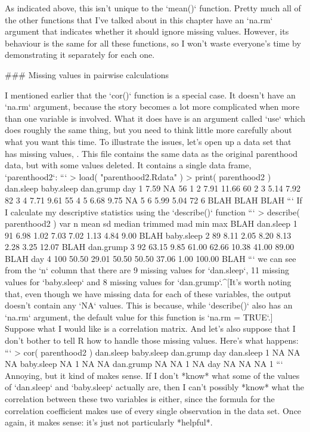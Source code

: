 As indicated above, this isn't unique to the `mean()` function. Pretty much all of the other functions that I've talked about in this chapter have an `na.rm` argument that indicates whether it should ignore missing values. However, its behaviour is the same for all these functions, so I won't waste everyone's time by demonstrating it separately for each one.


### Missing values in pairwise calculations

I mentioned earlier that the `cor()` function is a special case. It doesn't have an `na.rm` argument, because the story becomes a lot more complicated when more than one variable is involved. What it does have is an argument called `use` which does roughly the same thing, but you need to think  little more carefully about what you want this time. To illustrate the issues, let's open up a data set that has missing values, . This file contains the same data as the original parenthood data, but with some values deleted. It contains a single data frame, `parenthood2`:
```
> load( "parenthood2.Rdata" )
> print( parenthood2 )
  dan.sleep baby.sleep dan.grump day
1      7.59         NA        56   1
2      7.91      11.66        60   2
3      5.14       7.92        82   3
4      7.71       9.61        55   4
5      6.68       9.75        NA   5
6      5.99       5.04        72   6
BLAH BLAH BLAH
```
If I calculate my descriptive statistics using the `describe()` function
```
> describe( parenthood2 )
           var   n  mean    sd median trimmed   mad   min    max    BLAH
dan.sleep    1  91  6.98  1.02   7.03    7.02  1.13  4.84   9.00    BLAH
baby.sleep   2  89  8.11  2.05   8.20    8.13  2.28  3.25  12.07    BLAH
dan.grump    3  92 63.15  9.85  61.00   62.66 10.38 41.00  89.00    BLAH
day          4 100 50.50 29.01  50.50   50.50 37.06  1.00 100.00    BLAH
```
we can see from the `n` column that there are 9 missing values for `dan.sleep`, 11 missing values for `baby.sleep` and 8 missing values for `dan.grump`.^[It's worth noting that, even though we have missing data for each of these variables, the output doesn't contain any `NA` values. This is because, while `describe()` also has an `na.rm` argument, the default value for this function is `na.rm = TRUE`.] Suppose what I would like is a correlation matrix. And let's also suppose that I don't bother to tell R how to handle those missing values. Here's what happens:
```
> cor( parenthood2 )
           dan.sleep baby.sleep dan.grump day
dan.sleep          1         NA        NA  NA
baby.sleep        NA          1        NA  NA
dan.grump         NA         NA         1  NA
day               NA         NA        NA   1
```
Annoying, but it kind of makes sense. If I don't *know* what some of the values of `dan.sleep` and `baby.sleep` actually are, then I can't possibly *know* what the correlation between these two variables is either, since the formula for the correlation coefficient makes use of every single observation in the data set. Once again, it makes sense: it's just not particularly *helpful*.

